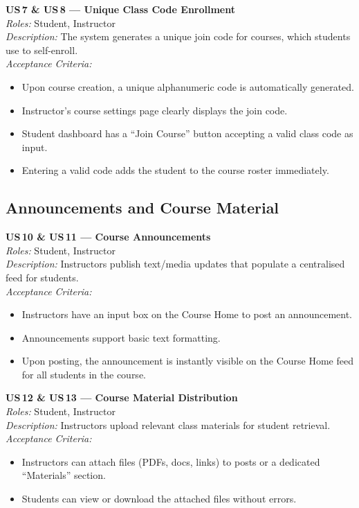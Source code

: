 \documentclass[11pt, legalpaper]{article}
\begin{document}
\begin{userstory}
  \textbf{US\,7 \& US\,8 — Unique Class Code Enrollment}\\[4pt]
  \textit{Roles:} Student, Instructor\\[2pt]
  \textit{Description:} The system generates a unique join code for courses,
  which students use to self-enroll.\\[4pt]
  \textit{Acceptance Criteria:}
  \begin{itemize}
    \item Upon course creation, a unique alphanumeric code is automatically
          generated.
    \item Instructor's course settings page clearly displays the join code.
    \item Student dashboard has a ``Join Course'' button accepting a valid
          class code as input.
    \item Entering a valid code adds the student to the course roster
          immediately.
  \end{itemize}
\end{userstory}

\subsection{Announcements and Course Material}

\begin{userstory}
  \textbf{US\,10 \& US\,11 — Course Announcements}\\[4pt]
  \textit{Roles:} Student, Instructor\\[2pt]
  \textit{Description:} Instructors publish text/media updates that populate
  a centralised feed for students.\\[4pt]
  \textit{Acceptance Criteria:}
  \begin{itemize}
    \item Instructors have an input box on the Course Home to post an
          announcement.
    \item Announcements support basic text formatting.
    \item Upon posting, the announcement is instantly visible on the Course
          Home feed for all students in the course.
  \end{itemize}
\end{userstory}

\begin{userstory}
  \textbf{US\,12 \& US\,13 — Course Material Distribution}\\[4pt]
  \textit{Roles:} Student, Instructor\\[2pt]
  \textit{Description:} Instructors upload relevant class materials for
  student retrieval.\\[4pt]
  \textit{Acceptance Criteria:}
  \begin{itemize}
    \item Instructors can attach files (PDFs, docs, links) to posts or a
          dedicated ``Materials'' section.
    \item Students can view or download the attached files without errors.
  \end{itemize}
\end{userstory}
\end{document}
